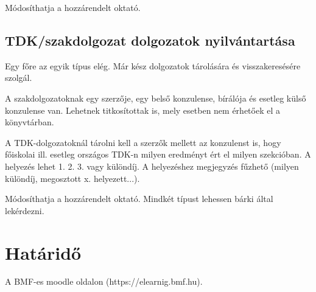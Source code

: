 \documentclass[a4paper]{article}
\begin{document}
Módosíthatja a hozzárendelt oktató.

\subsection{TDK/szakdolgozat dolgozatok nyilvántartása}
Egy főre az egyik típus elég.
Már kész dolgozatok tárolására és visszakeresésére szolgál.

A szakdolgozatoknak egy szerzője, egy belső konzulense, bírálója és
esetleg külső konzulense van. Lehetnek titkosítottak is, mely esetben
nem érhetőek el a könyvtárban.

A TDK-dolgozatoknál tárolni kell a szerzők mellett az konzulenst is, hogy
főiskolai ill. esetleg országos TDK-n milyen eredményt ért el milyen
szekcióban. A helyezés lehet 1. 2. 3. vagy különdíj. A helyezéshez
megjegyzés fűzhető (milyen különdíj, megosztott x. helyezett...).

Módosíthatja a hozzárendelt oktató.
Mindkét típust lehessen bárki által lekérdezni.

\section{Határidő}
A BMF-es moodle oldalon (https://elearnig.bmf.hu).
\end{document}
